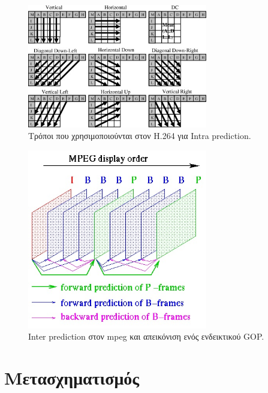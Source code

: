 \begin{figure}[H]
  \centering
    \includegraphics[width=0.7\textwidth]{chapter2/intrapred.jpg}
  \caption{Τρόποι που χρησιμοποιούνται στον Η.264 για Intra prediction. \cite{intrapred}}
    \label{fig:intrapred}
\end{figure}

\begin{figure}[H]
  \centering
    \includegraphics[width=0.7\textwidth]{chapter2/gop.jpg}
  \caption{Inter prediction στον mpeg και απεικόνιση ενός ενδεικτικού GOP. \cite{misc:gop}}
  \label{fig:gop}
\end{figure}

\newpage

\section{Μετασχηματισμός}
\label{section:sect24}

